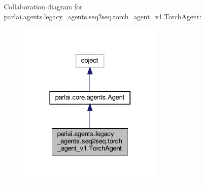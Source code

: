 Collaboration diagram for parlai.\+agents.\+legacy\+\_\+agents.\+seq2seq.\+torch\+\_\+agent\+\_\+v1.\+Torch\+Agent\+:
\nopagebreak
\begin{figure}[H]
\begin{center}
\leavevmode
\includegraphics[width=202pt]{d2/da6/classparlai_1_1agents_1_1legacy__agents_1_1seq2seq_1_1torch__agent__v1_1_1TorchAgent__coll__graph}
\end{center}
\end{figure}
